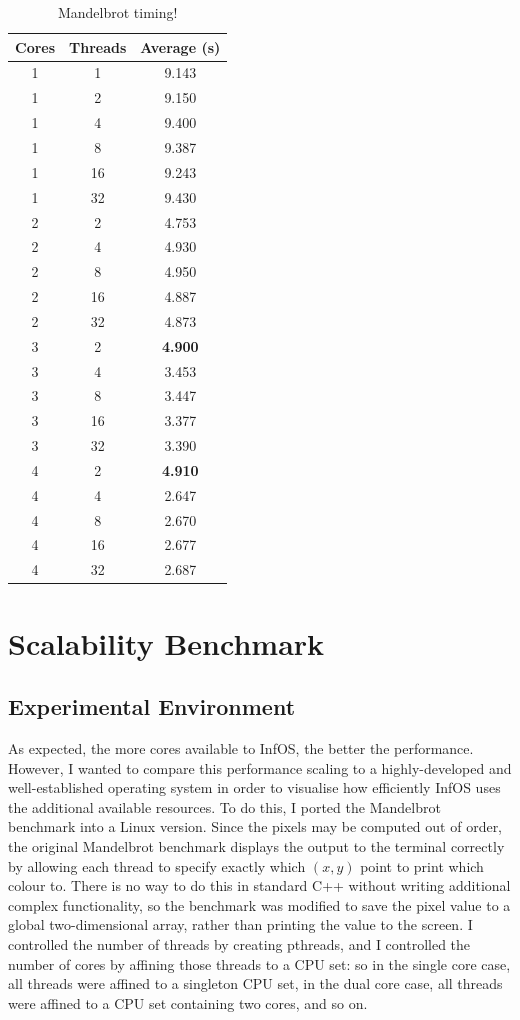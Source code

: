 \documentclass[bsc,frontabs,twoside,singlespacing,parskip,deptreport]{infthesis}     %
\begin{document}
\begin{table}[h]\centering
\caption{Mandelbrot timing!}\label{timing-infos-mb}
\scriptsize
\begin{tabular}{ccc}\toprule
Cores &Threads &Average (s) \\
\midrule
1 &1 &9.143 \\
\midrule
1 &2 &9.150 \\
1 &4 &9.400 \\
1 &8 &9.387 \\
1 &16 &9.243 \\
1 &32 &9.430 \\
\midrule
2 &2 &4.753 \\
2 &4 &4.930 \\
2 &8 &4.950 \\
2 &16 &4.887 \\
2 &32 &4.873 \\
\midrule
3 &2 &\textbf{4.900} \\
3 &4 &3.453 \\
3 &8 &3.447 \\
3 &16 &3.377 \\
3 &32 &3.390 \\
\midrule
4 &2 &\textbf{4.910} \\
4 &4 &2.647 \\
4 &8 &2.670 \\
4 &16 &2.677 \\
4 &32 &2.687 \\
\bottomrule
\end{tabular}
\end{table}

\section{Scalability Benchmark}
\label{mb-mod-benchmark}
\subsection{Experimental Environment} 
As expected, the more cores available to InfOS, the better the performance. However, I wanted to compare this performance scaling to a highly-developed and well-established operating system in order to visualise how efficiently InfOS uses the additional available resources. To do this, I ported the Mandelbrot benchmark into a Linux version. Since the pixels may be computed out of order, the original Mandelbrot benchmark displays the output to the terminal correctly by allowing each thread to specify exactly which $(x,y)$ point to print which colour to. There is no way to do this in standard C++ without writing additional complex functionality, so the benchmark was modified to save the pixel value to a global two-dimensional array, rather than printing the value to the screen. I controlled the number of threads by creating pthreads, and I controlled the number of cores by affining those threads to a CPU set: so in the single core case, all threads were affined to a singleton CPU set, in the dual core case, all threads were affined to a CPU set containing two cores, and so on. \\
\end{document}
